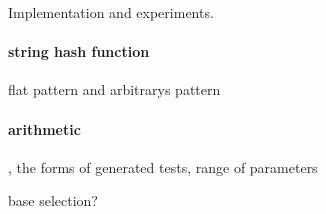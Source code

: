 
Implementation and experiments.

\paragraph{string hash function}
 flat pattern and arbitrarys pattern

\paragraph{arithmetic}
, the forms of generated tests, range of parameters 

base selection?